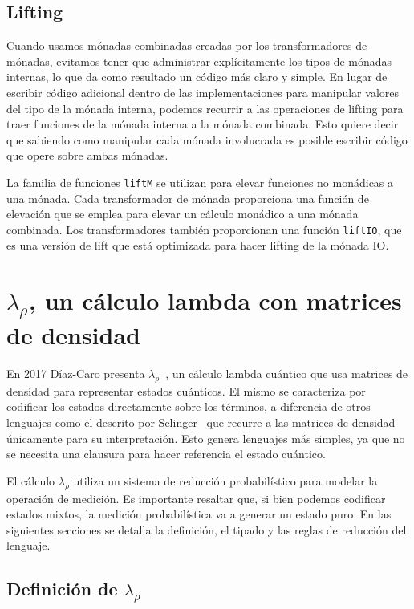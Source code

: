 \subsection{Lifting}

Cuando usamos mónadas combinadas creadas por los transformadores de mónadas, evitamos tener que administrar explícitamente los tipos de mónadas internas, lo que da como resultado un código más claro y simple. En lugar de escribir código adicional dentro de las implementaciones para manipular valores del tipo de la mónada interna, podemos recurrir a las operaciones de lifting para traer funciones de la mónada interna a la mónada combinada. Esto quiere decir que sabiendo como manipular cada mónada involucrada es posible escribir código que opere sobre ambas mónadas.

La familia de funciones \texttt{liftM} se utilizan para elevar funciones no monádicas a una mónada. Cada transformador de mónada proporciona una función de elevación que se emplea para elevar un cálculo monádico a una mónada combinada. Los transformadores también proporcionan una función \texttt{liftIO}, que es una versión de lift que está optimizada para hacer lifting de la mónada IO.

\section{\texorpdfstring{$\lambda_\rho$, un cálculo lambda con matrices de densidad}{Lambda Rho, un cálculo lambda con matrices de densidad}}\label{sec:lamrho_classic}

En 2017 Díaz-Caro presenta $\lambda_\rho$~\cite{lamrho}, un cálculo lambda cuántico que usa matrices de densidad para representar estados cuánticos. El mismo se caracteriza por codificar los estados directamente sobre los términos, a diferencia de otros lenguajes como el descrito por Selinger~\cite{SelingerMSCS04} que recurre a las matrices de densidad únicamente para su interpretación. Esto genera lenguajes más simples, ya que no se necesita una clausura para hacer referencia el estado cuántico.
 
El cálculo $\lambda_\rho$ utiliza un sistema de reducción probabilístico para modelar la operación de medición. Es importante resaltar que, si bien podemos codificar estados mixtos, la medición probabilística va a generar un estado puro. En las siguientes secciones se detalla la definición, el tipado y las reglas de reducción del lenguaje.

\subsection{\texorpdfstring{Definición de $\lambda_\rho$}{Definición de Lambda Rho}}

